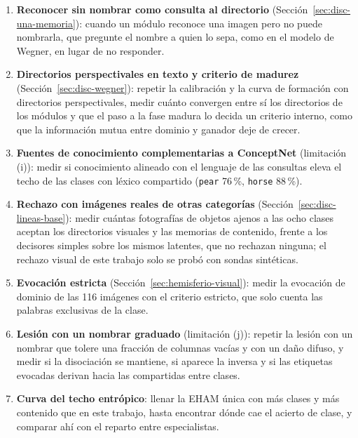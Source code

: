 \begin{enumerate}
    asignación de información de Wegner); que los módulos sigan registrando después de
    formar el directorio, y que el directorio se reorganice cuando un módulo sale del
    grupo o entra en él.
    \item \textbf{Reconocer sin nombrar como consulta al directorio}
    (Sección~\ref{sec:disc-una-memoria}): cuando un módulo reconoce una imagen pero no
    puede nombrarla, que pregunte el nombre a quien lo sepa, como en el modelo de
    Wegner, en lugar de no responder.
    \item \textbf{Directorios perspectivales en texto y criterio de madurez}
    (Sección~\ref{sec:disc-wegner}): repetir la calibración y la curva de formación con
    directorios perspectivales, medir cuánto convergen entre sí los directorios de los
    módulos y que el paso a la fase madura lo decida un criterio interno, como que la
    información mutua entre dominio y ganador deje de crecer.
    \item \textbf{Fuentes de conocimiento complementarias a ConceptNet} (limitación
    (i)): medir si conocimiento alineado con el lenguaje de las consultas eleva el techo
    de las clases con léxico compartido (\texttt{pear} 76\,\%, \texttt{horse} 88\,\%).
    \item \textbf{Rechazo con imágenes reales de otras categorías}
    (Sección~\ref{sec:disc-lineas-base}): medir cuántas fotografías de objetos ajenos a
    las ocho clases aceptan los directorios visuales y las memorias de contenido, frente
    a los decisores simples sobre los mismos latentes, que no rechazan ninguna; el
    rechazo visual de este trabajo solo se probó con sondas sintéticas.
    \item \textbf{Evocación estricta} (Sección~\ref{sec:hemisferio-visual}): medir la
    evocación de dominio de las 116 imágenes con el criterio estricto, que solo cuenta
    las palabras exclusivas de la clase.
    \item \textbf{Lesión con un nombrar graduado} (limitación (j)): repetir la lesión con
    un nombrar que tolere una fracción de columnas vacías y con un daño difuso, y medir
    si la disociación se mantiene, si aparece la inversa y si las etiquetas evocadas
    derivan hacia las compartidas entre clases.
    \item \textbf{Curva del techo entrópico}: llenar la EHAM única con más clases y más
    contenido que en este trabajo, hasta encontrar dónde cae el acierto de clase, y
    comparar ahí con el reparto entre especialistas.
\end{enumerate}

